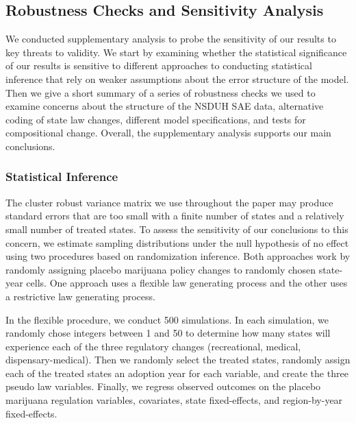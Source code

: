 \documentclass[12pt]{article}%
\begin{document}
\subsection{Robustness Checks and Sensitivity Analysis}
\label{sec:robust_a}

We conducted supplementary analysis to probe the sensitivity of our results to key threats to validity. 
We start by examining whether the statistical significance of our results is sensitive to different approaches to conducting statistical inference that rely on weaker assumptions about the error structure of the model. 
Then we give a short summary of a series of robustness checks we used to examine concerns about the structure of the NSDUH SAE data, alternative coding of state law changes, different model specifications, and tests for compositional change. Overall, the supplementary analysis supports our main conclusions. 

\subsubsection{Statistical Inference}
\label{sec:inference}
The cluster robust variance matrix we use throughout the paper may produce standard errors that are too small with a finite number of states and a relatively small number of treated states. To assess the sensitivity of our conclusions to this concern, we estimate sampling distributions under the null hypothesis of no effect using two procedures based on randomization inference. Both approaches work by randomly assigning placebo marijuana policy changes to randomly chosen state-year cells. One approach uses a flexible law generating process and the other uses a restrictive law generating process.

In the flexible procedure, we conduct 500 simulations. In each simulation, we randomly chose integers between 1 and 50 to determine how many states will experience each of the three regulatory changes (recreational, medical, dispensary-medical). Then we randomly select the treated states, randomly assign each of the treated states an adoption year for each variable, and create the three pseudo law variables. Finally, we regress observed outcomes on the placebo marijuana regulation variables, covariates, state fixed-effects, and region-by-year fixed-effects.
\end{document}
